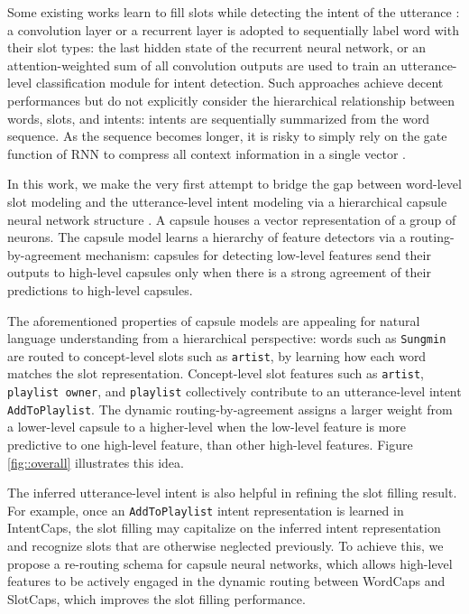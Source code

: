 \documentclass[11pt,a4paper,hyphens]{article}
\newcommand{\FirstCapsule}{WordCaps}
\newcommand{\SecondCapsule}{SlotCaps}
\newcommand{\ThirdCapsule}{IntentCaps}
\begin{document}
Some existing works learn to fill slots while detecting the intent of the utterance \cite{xu2013convolutional,hakkani2016multi,liu2016attention,goo2018slot}: a convolution layer or a recurrent layer is adopted to sequentially label word with their slot types: the last hidden state of the recurrent neural network, or an attention-weighted sum of all convolution outputs are used to train an utterance-level classification module for intent detection. Such approaches achieve decent performances but do not explicitly consider the hierarchical relationship between words, slots, and intents: intents are sequentially summarized from the word sequence.
As the sequence becomes longer, it is risky to simply rely on the gate function of RNN to compress all context information in a single vector \cite{cheng2016long}.

In this work, we make the very first attempt to bridge the gap between word-level slot modeling and the utterance-level intent modeling via a hierarchical capsule neural network structure \citep{hinton2011transforming,sabour2017dynamic}.
A capsule houses a vector representation of a group of neurons.
The capsule model learns a hierarchy of feature detectors via a routing-by-agreement mechanism: capsules for detecting low-level features send their outputs to high-level capsules only when there is a strong agreement of their predictions to high-level capsules.

The aforementioned properties of capsule models are appealing for natural language understanding from a hierarchical perspective: words such as \texttt{Sungmin} are routed to concept-level slots such as \texttt{artist}, by learning how each word matches the slot representation. Concept-level slot features such as \texttt{artist}, \texttt{playlist owner}, and \texttt{playlist} collectively contribute to an utterance-level intent \texttt{AddToPlaylist}. The dynamic routing-by-agreement assigns a larger weight from a lower-level capsule to a higher-level when the low-level feature is more predictive to one high-level feature, than other high-level features. Figure \ref{fig::overall} illustrates this idea.

The inferred utterance-level intent is also helpful in refining the slot filling result. For example, once an \texttt{AddToPlaylist} intent representation is learned in {\ThirdCapsule}, the slot filling may capitalize on the inferred intent representation and recognize slots that are otherwise neglected previously.
To achieve this, we propose a re-routing schema for capsule neural networks, which allows high-level features to be actively engaged in the dynamic routing between {\FirstCapsule} and {\SecondCapsule}, which improves the slot filling performance.
\end{document}
